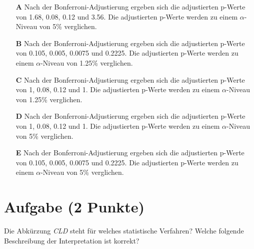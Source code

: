 \documentclass[a4paper, 9pt]{scrartcl}\usepackage[]{graphicx}\usepackage[]{xcolor}
\begin{document}
\begin{enumerate}
\item [\textbf{A} \msquare] Nach der Bonferroni-Adjustierung ergeben sich die adjustierten p-Werte von 1.68, 0.08, 0.12 und 3.56. Die adjustierten p-Werte werden zu einem $\alpha$-Niveau von 5\% verglichen.
\item [\textbf{B} \msquare] Nach der Bonferroni-Adjustierung ergeben sich die adjustierten p-Werte von 0.105, 0.005, 0.0075 und 0.2225. Die adjustierten p-Werte werden zu einem $\alpha$-Niveau von 1.25\% verglichen.
\item [\textbf{C} \msquare] Nach der Bonferroni-Adjustierung ergeben sich die adjustierten p-Werte von 1, 0.08, 0.12 und 1. Die adjustierten p-Werte werden zu einem $\alpha$-Niveau von 1.25\% verglichen.
\item [\textbf{D} \msquare] Nach der Bonferroni-Adjustierung ergeben sich die adjustierten p-Werte von 1, 0.08, 0.12 und 1. Die adjustierten p-Werte werden zu einem $\alpha$-Niveau von 5\% verglichen.
\item [\textbf{E} \msquare] Nach der Bonferroni-Adjustierung ergeben sich die adjustierten p-Werte von 0.105, 0.005, 0.0075 und 0.2225. Die adjustierten p-Werte werden zu einem $\alpha$-Niveau von 5\% verglichen.
\end{enumerate}

\section{Aufgabe \hfill (2 Punkte)}



Die Abkürzung \textit{CLD} steht für welches statistische Verfahren? Welche folgende Beschreibung der Interpretation ist korrekt?
\end{document}
